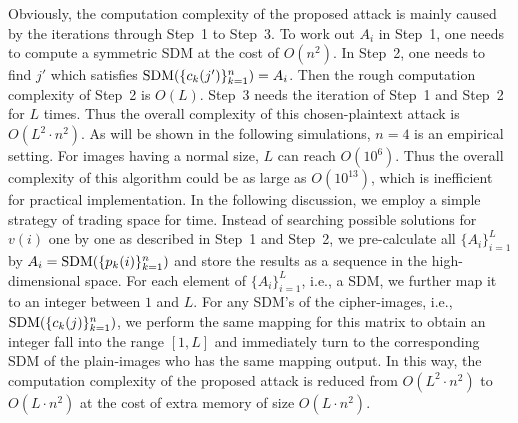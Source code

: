 \documentclass[smallextended, final]{svjour3}          \smartqed
\newcommand\SDM{{\rm SDM}}
\begin{document}
Obviously, the computation complexity of the proposed attack is mainly caused by the iterations through Step~1 to Step~3.
To work out $A_i$ in Step~1, one needs to compute a symmetric SDM at the cost of $O(n^2)$. In Step~2, one needs to find $j'$ which satisfies
$\SDM(\{c_{k}(j')\}_{k=1}^{n}) =  A_i$. Then the rough computation complexity of Step~2 is $O(L)$. Step~3 needs the iteration of Step~1 and Step~2 for $L$ times.
Thus the overall complexity of this chosen-plaintext attack is $O(L^2\cdot n^2)$. As will be shown in the following simulations, $n=4$ is an empirical setting.
For images having a normal size, $L$ can reach $O(10^6)$. Thus the overall complexity of this algorithm could be as large as $O(10^{13})$, which is inefficient for practical
implementation. In the following discussion, we employ a simple strategy of trading space for time.
Instead of searching possible solutions for $v(i)$ one by one as described in Step~1 and Step~2, we pre-calculate all $\{A_i\}_{i=1}^{L}$ by $A_i=\SDM(\{p_{k}(i)\}_{k=1}^{n})$
and store the results as a sequence in the high-dimensional space. For each element of $\{A_i\}_{i=1}^{L}$, i.e., a SDM, we further map it to an integer between $1$ and $L$.
For any SDM's of the cipher-images, i.e., $\SDM(\{c_{k}(j)\}_{k=1}^{n})$, we perform the same mapping for this matrix to obtain an integer fall into the range $[1, L]$ and immediately turn to the corresponding
SDM of the plain-images who has the same mapping output. In this way, the computation complexity of the proposed attack is reduced from  $O(L^2\cdot n^2)$ to $O(L\cdot n^2)$ at the cost
of extra memory of size $O(L\cdot n^2)$.
\end{document}

